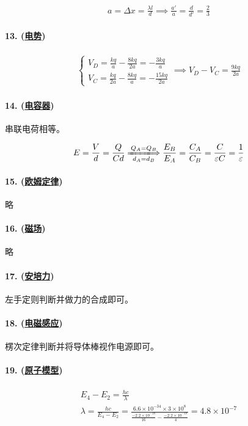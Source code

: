 \begin{gather*}
    a=\Delta x=\frac{\lambda l}{d}\implies
    \frac{a'}{a}=\frac{d}{d'}=\frac23
\end{gather*}

\paragraph{13. (\hyperref[subsec:电势]{电势})}

\begin{gather*}
    \begin{cases}
        V_D=\frac{kq}{a}-\frac{8kq}{2a}=-\frac{3kq}{a}\\
        V_C=\frac{kq}{2a}-\frac{8kq}{a}=-\frac{15kq}{2a}
    \end{cases}\implies
    V_D-V_C=\frac{9kq}{2a}
\end{gather*}

\paragraph{14. (\hyperref[subsec:电容器]{电容器})} 串联电荷相等。

\begin{equation*}
    E=\frac{V}{d}=\frac{Q}{Cd}\xLongrightarrow[d_A=d_B]{Q_A=Q_B}
    \frac{E_B}{E_A}=\frac{C_A}{C_B}=\frac{C}{\varepsilon C}=\frac1\varepsilon
\end{equation*}

\paragraph{15. (\hyperref[subsec:欧姆定律]{欧姆定律})} 略
\paragraph{16. (\hyperref[subsec:磁场]{磁场})} 略
\paragraph{17. (\hyperref[subsec:安培力]{安培力})} 左手定则判断并做力的合成即可。
\paragraph{18. (\hyperref[subsec:电磁感应]{电磁感应})} 楞次定律判断并将导体棒视作电源即可。
\paragraph{19. (\hyperref[sec:原子模型]{原子模型})}

\begin{gather*}
    E_4-E_2=\frac{hc}{\lambda}\\
    \lambda=\frac{hc}{E_4-E_2}
    =\frac{6.6\times10^{-34}\times3\times10^8}{\frac{-2.2\times10^{-18}}{16}-\frac{-2.2\times10^{-18}}{4}}
    =4.8\times10^{-7}
\end{gather*}

